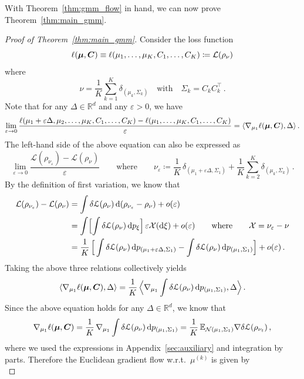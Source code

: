 \documentclass{custom}
\begin{document}
With Theorem~\ref{thm:gmm_flow} in hand, we can now prove Theorem~\ref{thm:main_gmm}.

\begin{proof}[Proof of Theorem~\ref{thm:main_gmm}]
Consider the loss function 
\[
\ell(\boldsymbol \mu,\boldsymbol C) \equiv \ell(\mu_1,\ldots,\mu_K,C_1,\ldots,C_K) \coloneqq \mathcal{L}(\rho_\nu)
\]
where
\[
\nu = \frac{1}{K} \sum_{k=1}^{K}\delta_{(\mu_k,\Sigma_k)}\quad \text{with}\quad \Sigma_k = C_k C_k^\top\,.
\]
Note that for any $\Delta \in \mathbb{R}^d$ and any $\varepsilon>0$, we have
\[
    \lim_{\varepsilon\to 0} \frac{\ell(\mu_1 +\varepsilon\Delta, \mu_2,\ldots,\mu_K,C_1,\ldots,C_K) - \ell(\mu_1,\ldots,\mu_K,C_1,\ldots,C_K)}{\varepsilon} = \langle \nabla_{\mu_1} \ell(\boldsymbol \mu,\boldsymbol C), \Delta \rangle\,.
\]
The left-hand side of the above equation can also be expressed as
\[
\lim_{\varepsilon\to 0} \frac{\mathcal{L}(\rho_{\nu_\varepsilon}) - \mathcal{L}(\rho_{\nu})}{\varepsilon} \qquad \text{where} \qquad \nu_\varepsilon \coloneqq \frac{1}{K}\, \delta_{(\mu_1+\varepsilon \Delta,\Sigma_1)}+ \frac{1}{K} \sum_{k=2}^{K}\delta_{(\mu_k,\Sigma_k)}\,.
\]
By the definition of first variation, we know that
\begin{align*}
\mathcal{L}(\rho_{\nu_\varepsilon}) - \mathcal{L}(\rho_{\nu}) 
&= \int \delta\EuScript{L}(\rho_\nu)\,\mathrm d (\rho_{\nu_\varepsilon}-\rho_\nu) + o(\varepsilon) \\
&=\int \Bigl[\int \delta \EuScript{L}(\rho_\nu)\, \mathrm d p_\xi\Bigr] \,\varepsilon \mathcal X(\mathrm d \xi) + o(\varepsilon) \qquad \text{where}\qquad 
\mathcal{X}= \nu_\varepsilon - \nu \\
&= \frac{1}{K}\, \Big[ \int \delta \EuScript{L}(\rho_\nu)\, \mathrm d p_{(\mu_1+\varepsilon\Delta,\Sigma_1)} - \int \delta \EuScript{L}(\rho_\nu)\, \mathrm d p_{(\mu_1,\Sigma_1)} \Big] + o(\varepsilon)\,.
\end{align*}
Taking the above three relations collectively yields
\[
\langle \nabla_{\mu_1} \ell(\boldsymbol \mu,\boldsymbol C), \Delta \rangle = \frac{1}{K}\, \Big\langle\nabla_{\mu_1} \int \delta \EuScript{L}(\rho_\nu)\, \mathrm d p_{(\mu_1,\Sigma_1)}, \Delta \Big\rangle\,.
\]
Since the above equation holds for any $\Delta\in\mathbb{R}^d$, we know that
\[
\nabla_{\mu_1} \ell(\boldsymbol \mu,\boldsymbol C) = \frac{1}{K}\, \nabla_{\mu_1} \int \delta \EuScript{L}(\rho_\nu)\, \mathrm d p_{(\mu_1,\Sigma_1)} = \frac{1}{K}\, \mathbb E_{\mathcal N(\mu_1,\Sigma_1)}\nabla \delta \EuScript{L} (\rho_{\nu_t})\,,
\]
where we used the expressions in Appendix~\ref{sec:auxiliary} and integration by parts. Therefore the Euclidean gradient flow w.r.t.~$\mu^{(k)}$ is given by
\begin{equation} \label{eq:Euclidean-GF-mu}

\end{equation}
\end{proof}
\end{document}

